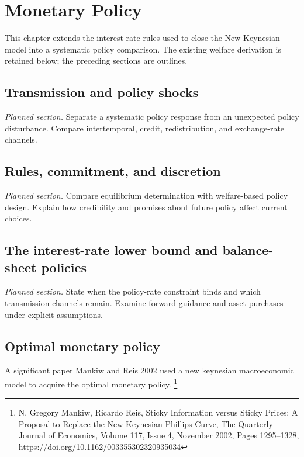 \section{Monetary Policy}\label{sec:monetary-policy}

This chapter extends the interest-rate rules used to close the New Keynesian
model into a systematic policy comparison. The existing welfare derivation is
retained below; the preceding sections are outlines.

\subsection[Transmission and policy shocks (planned)]{Transmission and policy shocks}
\textit{Planned section.} Separate a systematic policy response from an unexpected policy disturbance.
Compare intertemporal, credit, redistribution, and exchange-rate channels.

\subsection[Rules, commitment, and discretion (planned)]{Rules, commitment, and discretion}
\textit{Planned section.} Compare equilibrium determination with welfare-based policy design.
Explain how credibility and promises about future policy affect current choices.

\subsection[The interest-rate lower bound and balance-sheet policies (planned)]{The interest-rate lower bound and balance-sheet policies}
\textit{Planned section.} State when the policy-rate constraint binds and which transmission channels
remain. Examine forward guidance and asset purchases under explicit assumptions.

\subsection{Optimal monetary policy}

A significant paper Mankiw and Reis 2002 used a new keynesian macroeconomic model to acquire the optimal monetary policy.
\footnote{N. Gregory Mankiw, Ricardo Reis, Sticky Information versus Sticky Prices: A Proposal to Replace the New Keynesian Phillips Curve, The Quarterly Journal of Economics, Volume 117, Issue 4, November 2002, Pages 1295–1328, https://doi.org/10.1162/003355302320935034}


